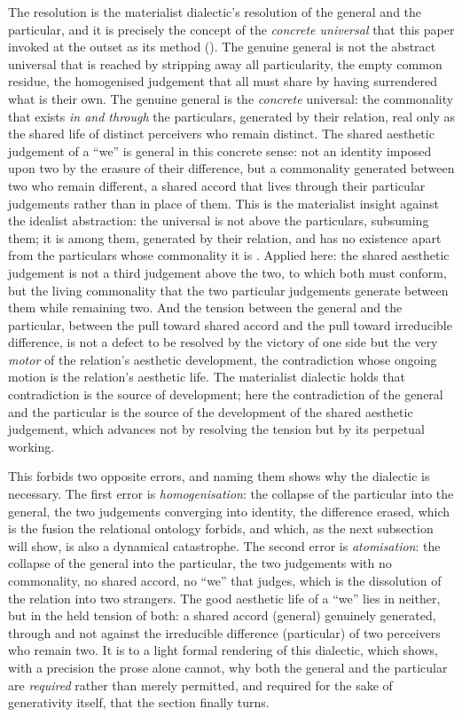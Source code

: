 The resolution is the materialist dialectic's resolution of the general and the particular, and it is precisely the concept of the \emph{concrete universal} that this paper invoked at the outset as its method (). The genuine general is not the abstract universal that is reached by stripping away all particularity, the empty common residue, the homogenised judgement that all must share by having surrendered what is their own. The genuine general is the \emph{concrete} universal: the commonality that exists \emph{in and through} the particulars, generated by their relation, real only as the shared life of distinct perceivers who remain distinct. The shared aesthetic judgement of a ``we'' is general in this concrete sense: not an identity imposed upon two by the erasure of their difference, but a commonality generated between two who remain different, a shared accord that lives through their particular judgements rather than in place of them. This is the materialist insight against the idealist abstraction: the universal is not above the particulars, subsuming them; it is among them, generated by their relation, and has no existence apart from the particulars whose commonality it is \parencite{marx1992}. Applied here: the shared aesthetic judgement is not a third judgement above the two, to which both must conform, but the living commonality that the two particular judgements generate between them while remaining two. And the tension between the general and the particular, between the pull toward shared accord and the pull toward irreducible difference, is not a defect to be resolved by the victory of one side but the very \emph{motor} of the relation's aesthetic development, the contradiction whose ongoing motion is the relation's aesthetic life. The materialist dialectic holds that contradiction is the source of development; here the contradiction of the general and the particular is the source of the development of the shared aesthetic judgement, which advances not by resolving the tension but by its perpetual working.

This forbids two opposite errors, and naming them shows why the dialectic is necessary. The first error is \emph{homogenisation}: the collapse of the particular into the general, the two judgements converging into identity, the difference erased, which is the fusion the relational ontology forbids, and which, as the next subsection will show, is also a dynamical catastrophe. The second error is \emph{atomisation}: the collapse of the general into the particular, the two judgements with no commonality, no shared accord, no ``we'' that judges, which is the dissolution of the relation into two strangers. The good aesthetic life of a ``we'' lies in neither, but in the held tension of both: a shared accord (general) genuinely generated, through and not against the irreducible difference (particular) of two perceivers who remain two. It is to a light formal rendering of this dialectic, which shows, with a precision the prose alone cannot, why both the general and the particular are \emph{required} rather than merely permitted, and required for the sake of generativity itself, that the section finally turns.

